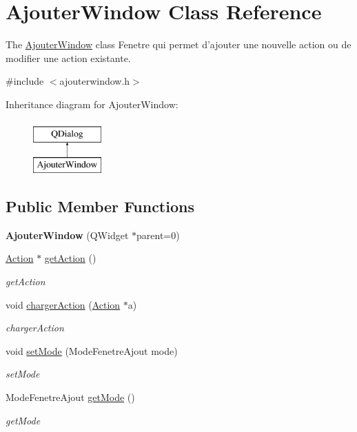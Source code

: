 \hypertarget{classAjouterWindow}{\section{Ajouter\-Window Class Reference}
\label{classAjouterWindow}
}


The \hyperlink{classAjouterWindow}{Ajouter\-Window} class Fenetre qui permet d'ajouter une nouvelle action ou de modifier une action existante.  




{\ttfamily \#include $<$ajouterwindow.\-h$>$}

Inheritance diagram for Ajouter\-Window\-:\begin{figure}[H]
\begin{center}
\leavevmode
\includegraphics[height=2.000000cm]{classAjouterWindow}
\end{center}
\end{figure}
\subsection*{Public Member Functions}
\begin{DoxyCompactItemize}
\item 
\hypertarget{classAjouterWindow_a49160e34b711dab52c01c0bb9cd2fbfe}{{\bfseries Ajouter\-Window} (Q\-Widget $\ast$parent=0)}\label{classAjouterWindow_a49160e34b711dab52c01c0bb9cd2fbfe}

\item 
\hyperlink{classAction}{Action} $\ast$ \hyperlink{classAjouterWindow_a5266dae4f573c1b393d102aaeed7efc5}{get\-Action} ()
\begin{DoxyCompactList}\small\item\em get\-Action \end{DoxyCompactList}\item 
void \hyperlink{classAjouterWindow_a9a5ead98ac132e5d321b9c84b8f3e592}{charger\-Action} (\hyperlink{classAction}{Action} $\ast$a)
\begin{DoxyCompactList}\small\item\em charger\-Action \end{DoxyCompactList}\item 
void \hyperlink{classAjouterWindow_a2e29777ba09da326361a71d677a477a8}{set\-Mode} (Mode\-Fenetre\-Ajout mode)
\begin{DoxyCompactList}\small\item\em set\-Mode \end{DoxyCompactList}\item 
Mode\-Fenetre\-Ajout \hyperlink{classAjouterWindow_a2c274a0974cb2e8c02bcd47453e2a6cf}{get\-Mode} ()
\begin{DoxyCompactList}\small\item\em get\-Mode \end{DoxyCompactList}\end{DoxyCompactItemize}


